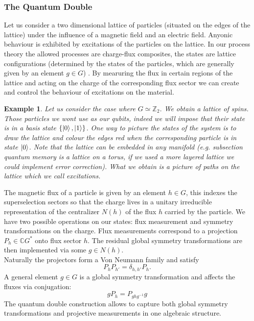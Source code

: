 \documentclass{article}
\newtheorem{example}{Example}
\begin{document}
\subsubsection{The Quantum Double}
Let us consider a two dimensional lattice of particles (situated on the edges of the lattice) under the influence of a magnetic field and an electric field. Anyonic behaviour is exhibited by excitations of the particles on the lattice. In our process theory the allowed processes are charge-flux composites, the states are lattice configurations (determined by the states of the particles, which are generally given by an element $g \in G$)  . By mearuring the flux in certain regions of the lattice and acting on the charge of the corresponding flux sector we can create and control the behaviour of excitations on the material.
\begin{example}
Let us consider the case where $G \simeq \mathbb{Z}_2$. We obtain a lattice of spins. Those particles we wont use as our qubits, indeed we will impose that their state is in a basis state $\{\ket{0},\ket{1}\}$. One way to picture the states of the system is to draw the lattice and colour the edges red when the corresponding particle is in state $\ket{0}$. Note that the lattice can be embedded in any manifold (e.g. subsection quantum memory is a lattice on a torus, if we used a more layered lattice we could implement error correction). What we obtain is a picture of paths on the lattice which we call excitations.
\end{example}
The magnetic flux of a particle is given by an element $h \in G$, this indexes the superselection sectors so that the charge lives in a unitary irreducible representation of the centralizer $N(h)$ of the flux $h$ carried by the particle. We have two possible operations on our states: flux measurement and symmetry transformations on the charge. Flux measurements correspond to a projection $P_h \in \mathbb{C}G^*$ onto flux sector $h$. The residual global symmetry transformations are then implemented via some $g \in N(h)$. \\
Naturally the projectors form a Von Neumann family and satisfy 
$$P_hP_{h'}= \delta_{h,h'} P_h.$$ 
A general element $g \in G$ is a global symmetry transformation and affects the fluxes via conjugation:
\begin{equation}
gP_h = P_{ghg^{-1}}g
\end{equation}
The quantum double construction allows to capture both global symmetry transformations and projective measurements in one algebraic structure.
\end{document}
